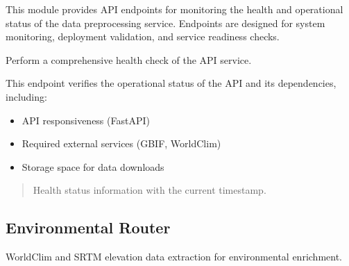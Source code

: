 \documentclass[letterpaper,10pt,english]{sphinxmanual}
\begin{document}
\sphinxAtStartPar
This module provides API endpoints for monitoring the health and operational status
of the data preprocessing service. Endpoints are designed for system monitoring,
deployment validation, and service readiness checks.

\begin{fulllineitems}
\label{\detokenize{api_reference:app.routers.status.health_check}}
\pysigstartsignatures
\pysiglinewithargsret
{}
{}
{}
\pysigstopsignatures
\sphinxAtStartPar
Perform a comprehensive health check of the API service.

\sphinxAtStartPar
This endpoint verifies the operational status of the API and its dependencies, including:
\begin{itemize}
\item {} 
\sphinxAtStartPar
API responsiveness (FastAPI)

\item {} 
\sphinxAtStartPar
Required external services (GBIF, WorldClim)

\item {} 
\sphinxAtStartPar
Storage space for data downloads

\end{itemize}
\begin{quote}\begin{description}
\sphinxAtStartPar
Health status information with the current timestamp.

\sphinxAtStartPar
{}

\end{description}\end{quote}

\end{fulllineitems}



\subsection{Environmental Router}
\label{\detokenize{api_reference:environmental-router}}
\sphinxAtStartPar
WorldClim and SRTM elevation data extraction for environmental enrichment.
\end{document}
